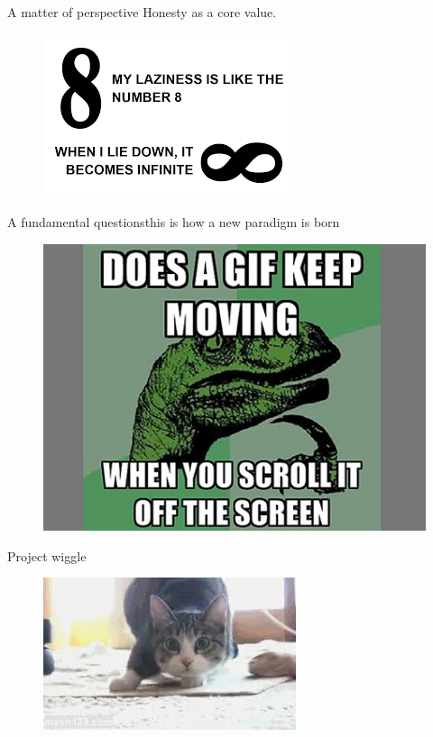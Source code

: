 \documentclass{beamer}
\begin{document}
\begin{frame}
  \titlepage
\end{frame}


\begin{frame}{A matter of perspective}{}  
Honesty as a core value.
\begin{figure}[h]
\centering
\includegraphics[scale=0.63]{../images/laziness1.png}
\end{figure}
\end{frame}


\begin{frame}{A fundamental questions}{this is how a new paradigm is born }  
\begin{figure}[h]
\centering
\includegraphics[scale=0.58]{../images/velociraptor1.jpg}
\end{figure}
\end{frame}

\begin{frame}{Project wiggle}{}  
\begin{figure}[h]
\centering
\includegraphics[scale=0.98]{../images/wiggle1.jpg}
\end{figure}
\end{frame}

\end{document}
